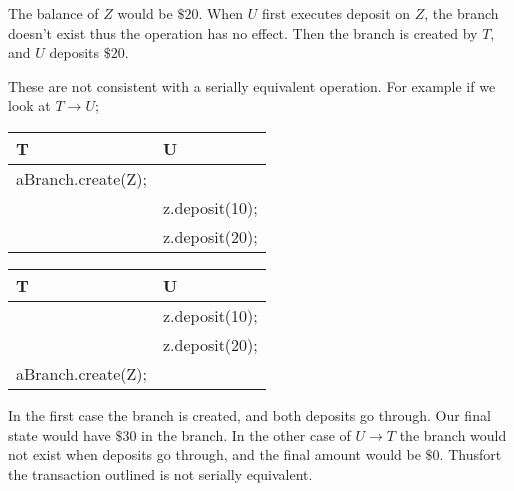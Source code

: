 \documentclass{article}
\begin{document}
\begin{tcolorbox}[colback=green!5!white,colframe=green!75!black,title=Answer 16.4]
The balance of $Z$ would be $\$20$. When $U$ first executes deposit on $Z$, the branch doesn't exist thus the operation has no effect.
Then the branch is created by $T$, and $U$ deposits $\$20$.

These are not consistent with a serially equivalent operation. For example if we look at $T \rightarrow U$;

\begin{multicols}{2}
    \begin{table}[H]
    \centering
    \begin{tabular}{ll}
    T                                        & U                                   \\ \hline
    \multicolumn{1}{c}{aBranch.create(Z);}                   & \multicolumn{1}{c}{} \\
    \multicolumn{1}{c}{} & \multicolumn{1}{c}{z.deposit(10);}               \\
                                             & z.deposit(20);                      \\ \hline
    \end{tabular}
    \end{table}

    \begin{table}[H]
    \centering
    \begin{tabular}{ll}
    T                                        & U                                   \\ \hline
    \multicolumn{1}{c}{}                   & \multicolumn{1}{c}{z.deposit(10);} \\
    \multicolumn{1}{c}{} & \multicolumn{1}{c}{z.deposit(20);}               \\
                        aBranch.create(Z);&                      \\ \hline
    \end{tabular}
    \end{table}

\end{multicols}

In the first case the branch is created, and both deposits go through. Our final state would have $\$30$ in the branch. In the other case of $U \rightarrow T$ the branch would not exist
when deposits go through, and the final amount would be $\$0$. Thusfort the transaction outlined is not
serially equivalent.
\end{tcolorbox}
\end{document}
